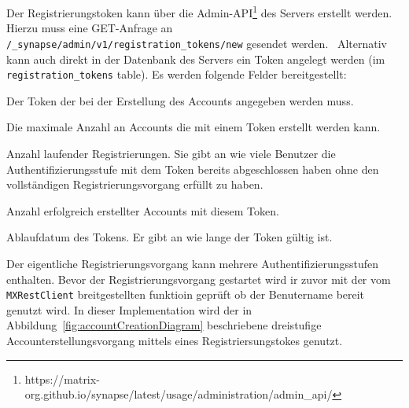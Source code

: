     Der Registrierungstoken kann über die Admin-API\footnote{https://matrix-org.github.io/synapse/latest/usage/administration/admin\_api/} des Servers erstellt werden.
    Hierzu muss eine GET-Anfrage an \texttt{/\_synapse/admin/v1/registration\_tokens/new} gesendet werden.~\cite{synapseregistartiontoken}
    Alternativ kann auch direkt in der Datenbank des Servers ein Token angelegt werden (im \texttt{registration\_tokens} table).
    Es werden folgende Felder bereitgestellt:
    \begin{description}[leftmargin=!,labelwidth=3cm]
        \item [token] Der Token der bei der Erstellung des Accounts angegeben werden muss.
        \item [uses\_allowed] Die maximale Anzahl an Accounts die mit einem Token erstellt werden kann.
        \item [pending] Anzahl laufender Registrierungen.
        Sie gibt an wie viele Benutzer die Authentifizierungsstufe mit dem Token bereits abgeschlossen haben ohne den vollständigen Registrierungsvorgang erfüllt zu haben.
        \item [completed] Anzahl erfolgreich erstellter Accounts mit diesem Token.
        \item [expiry\_time] Ablaufdatum des Tokens. Er gibt an wie lange der Token gültig ist.
    \end{description}

    Der eigentliche Registrierungsvorgang kann mehrere Authentifizierungsstufen enthalten.
    Bevor der Registrierungsvorgang gestartet wird ir zuvor mit der vom \texttt{MXRestClient} breitgestellten funktioin geprüft ob der Benutername bereit genutzt wird.
    In dieser Implementation wird der in Abbildung~\ref{fig:accountCreationDiagram} beschriebene dreistufige Accounterstellungsvorgang mittels eines Registriersungstokes genutzt.

